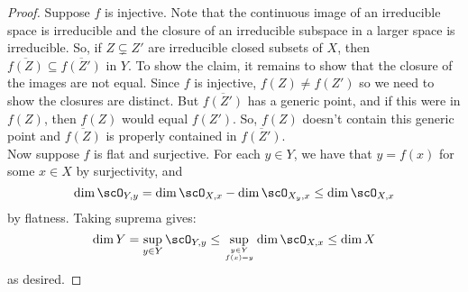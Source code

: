 \begin{proof}
	Suppose $f$ is injective. Note that the continuous image of an irreducible space is irreducible and the closure of an irreducible subspace in a larger space is irreducible. So, if $Z \subsetneq Z'$ are irreducible closed subsets of $X$, then $\overline{f(Z)} \subseteq \overline{f(Z')}$ in $Y$. To show the claim, it remains to show that the closure of the images are not equal. Since $f$ is injective, $f(Z) \neq f(Z')$ so we need to show the closures are distinct. But $\overline{f(Z')}$ has a generic point, and if this were in $f(Z)$, then $f(Z)$ would equal $f(Z')$. So, $f(Z)$ doesn't contain this generic point and $\overline{f(Z)}$ is properly contained in $\overline{f(Z')}$. \\
	
	Now suppose $f$ is flat and surjective. For each $y \in Y$, we have that $y = f(x)$ for some $x \in X$ by surjectivity, and
	\[ \dim \scO_{Y,y} = \dim \scO_{X,x} - \dim \scO_{X_y,x} \leq \dim \scO_{X,x} \]
	by flatness. Taking suprema gives:
	\[ \dim Y = \sup_{y \in Y} \scO_{Y,y} \leq \sup_{y \in Y \atop f(x) = y} \dim \scO_{X,x} \leq \dim X \]
	as desired.
\end{proof}
